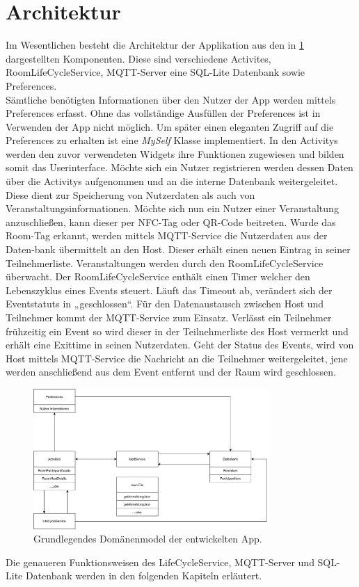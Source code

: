 \section{Architektur}
\label{sec:Architektur}
Im Wesentlichen besteht die Architektur der Applikation aus den in \cref{img:dmodel} dargestellten Komponenten. Diese sind verschiedene Activites, RoomLifeCycleService, MQTT-Server eine SQL-Lite Datenbank sowie Preferences.\\
Sämtliche benötigten Informationen über den Nutzer der App werden mittels Preferences erfasst. Ohne das vollständige Ausfüllen der Preferences ist in Verwenden der App nicht möglich. Um später einen eleganten Zugriff auf die Preferences zu erhalten ist eine \textit{MySelf} Klasse implementiert. 
In den Activitys werden den zuvor verwendeten Widgets ihre Funktionen zugewiesen und bilden somit das Userinterface.
 Möchte sich ein Nutzer registrieren werden dessen Daten über die Activitys aufgenommen und an die interne Datenbank weitergeleitet. 
Diese dient zur Speicherung von Nutzerdaten als auch von Veranstaltungsinformationen. 
Möchte sich nun ein Nutzer einer Veranstaltung anzuschließen, kann dieser per NFC-Tag oder QR-Code beitreten.
 Wurde das Room-Tag erkannt, werden mittels MQTT-Service die Nutzerdaten aus der Daten-bank übermittelt an den Host.
 Dieser erhält einen neuen Eintrag in seiner Teilnehmerliste.
Veranstaltungen werden durch den RoomLifeCycleService überwacht. Der RoomLifeCycleService enthält einen Timer welcher den Lebenszyklus eines Events steuert. 
Läuft das Timeout ab, verändert sich der Eventstatuts in „geschlossen“. 
Für den Datenaustausch zwischen Host und Teilnehmer kommt der MQTT-Service zum Einsatz. 
Verlässt ein Teilnehmer frühzeitig ein Event so wird dieser in der Teilnehmerliste des Host vermerkt und erhält eine Exittime in seinen Nutzerdaten. 
Geht der Status des Events, wird von Host mittels MQTT-Service die Nachricht an die Teilnehmer weitergeleitet, 
jene werden anschließend aus dem Event entfernt und der Raum wird geschlossen.  
\begin{figure}
	\centering
	\includegraphics[width =0.8\textwidth]{images/DomaenenModel.pdf}
	\caption{Grundlegendes Domänenmodel der entwickelten App.}
	\label{img:dmodel}
\end{figure}
Die genaueren Funktionsweisen des LifeCycleService, MQTT-Server und SQL-Lite Datenbank werden in den folgenden Kapiteln erläutert.



